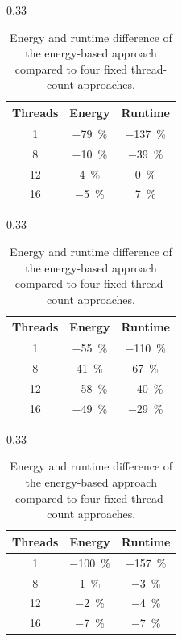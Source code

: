 \documentclass[runningheads]{llncs}
\begin{document}
\begin{table}[ht]
  \centering
  \begin{subtable}{0.33\linewidth}
    \centering
    \begin{tabular}{ccc}\toprule
      Threads & Energy & Runtime \\\midrule
      1  & \qty{-79}{\percent} & \qty{-137}{\percent} \\
      8  & \qty{-10}{\percent} & \qty{-39}{\percent} \\
      12 & \qty{4}{\percent}   & \qty{0}{\percent} \\
      16 & \qty{-5}{\percent}  & \qty{7}{\percent} \\
    \bottomrule\end{tabular}%
    \caption{Nine-point stencil.}%
    \label{tab:static-stencil}
  \end{subtable}%
  \begin{subtable}{0.33\linewidth}
    \centering
    \begin{tabular}{ccc}\toprule
      Threads & Energy & Runtime \\\midrule
      1  & \qty{-55}{\percent} & \qty{-110}{\percent} \\
      8  & \qty{41}{\percent} & \qty{67}{\percent} \\
      12 & \qty{-58}{\percent} & \qty{-40}{\percent} \\
      16 & \qty{-49}{\percent} & \qty{-29}{\percent} \\
    \bottomrule\end{tabular}%
    \caption{Matrix multiplication.}%
    \label{tab:static-matmul}
  \end{subtable}%
  \begin{subtable}{0.33\linewidth}
    \centering
    \begin{tabular}{ccc}\toprule
      Threads & Energy & Runtime \\\midrule
      1  & \qty{-100}{\percent} & \qty{-157}{\percent} \\
      8  & \qty{1}{\percent}    & \qty{-3}{\percent} \\
      12 & \qty{-2}{\percent}   & \qty{-4}{\percent} \\
      16 & \qty{-7}{\percent}   & \qty{-7}{\percent} \\
    \bottomrule\end{tabular}%
    \caption{Rust implementation.}%
    \label{tab:static-rust}
  \end{subtable}%
  \caption{Energy and runtime difference of the energy-based approach compared to four fixed thread-count approaches.}%
  \label{fig:static}
\end{table}
\end{document}
